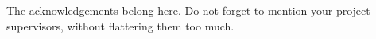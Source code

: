 
\begin{acknowledgements}
\addchaptertocentry{\acknowledgementname} %

The acknowledgements belong here. Do not forget to mention your project supervisors, without flattering them too much.
\end{acknowledgements}
